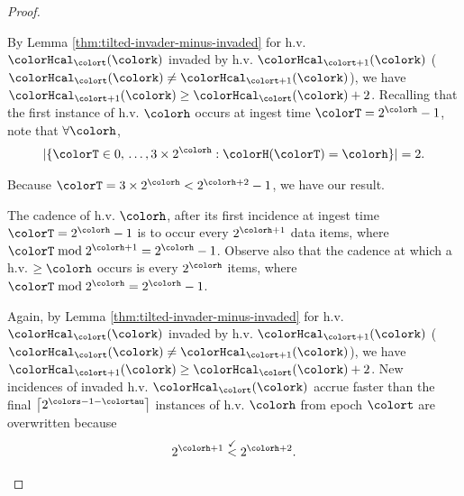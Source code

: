 \begin{proof}
\begin{proofpart}
By Lemma \ref{thm:tilted-invader-minus-invaded} for h.v. $\colorHcal_{\colort}(\colork)$ invaded by h.v. $\colorHcal_{\colort + 1}(\colork)$ ($\colorHcal_{\colort}(\colork) \neq \colorHcal_{\colort + 1}(\colork)$), we have $\colorHcal_{\colort + 1}(\colork) \geq \colorHcal_{\colort}(\colork) + 2$.
Recalling that the first instance of h.v. $\colorh$ occurs at ingest time $\colorT = 2^{\colorh} - 1$, note that $\forall\colorh$,
\begin{align*}
|\{\colorT \in 0,\,\ldots, 3 \times 2^{\colorh} : \colorH(\colorT) = \colorh\}| = 2.
\end{align*}
\end{proofpart}
Because $\colorT = 3 \times 2^{\colorh} < 2^{\colorh + 2} - 1$, we have our result.

\begin{proofpart}
The cadence of h.v. $\colorh$, after its first incidence at ingest time $\colorT=2^{\colorh} - 1$ is to occur every $2^{\colorh + 1}$ data items, where $\colorT \bmod 2^{\colorh + 1} = 2^{\colorh} - 1$.
Observe also that the cadence at which a h.v. $\geq\colorh$ occurs is every $2^{\colorh}$ items, where $\colorT \bmod 2^{\colorh} = 2^{\colorh} - 1$.

Again, by Lemma \ref{thm:tilted-invader-minus-invaded} for h.v. $\colorHcal_{\colort}(\colork)$ invaded by h.v. $\colorHcal_{\colort + 1}(\colork)$ ($\colorHcal_{\colort}(\colork) \neq \colorHcal_{\colort + 1}(\colork)$), we have $\colorHcal_{\colort + 1}(\colork) \geq \colorHcal_{\colort}(\colork) + 2$.
New incidences of invaded h.v. $\colorHcal_{\colort}(\colork)$ accrue faster than the final $\left\lceil 2^{\colors - 1 - \colortau} \right\rceil$ instances of h.v. $\colorh$ from epoch $\colort$ are overwritten because
\begin{align*}
2^{\colorh + 1} \stackrel{\checkmark}{<} 2^{\colorh + 2}.
\end{align*}
\end{proofpart}

\end{proof}
